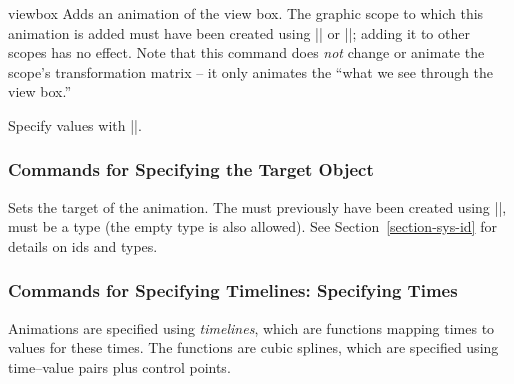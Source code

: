 \begin{sysanimateattribute}{viewbox}
  Adds an animation of the view box. The graphic scope to which this
  animation is added must have been created using
  |\pgfsys@viewboxmeet| or |\pgfsys@viewboxslice|; adding it to other
  scopes has no effect. Note that this command does \emph{not}
  change or animate the scope's transformation matrix -- it only animates the
  ``what we see through the view box.''
  
  Specify values with |\pgfsys@animation@val@viewbox|.
\begin{codeexample}[width=5cm]
\end{codeexample}
\end{sysanimateattribute}


\subsubsection{Commands for Specifying the Target Object}

\begin{command}{\pgfsys@animation@whom{}}
  Sets the target of the animation. The  must previously have
  been created using |\pgfsys@new@id|,  must be a type (the
  empty type is also allowed). See Section~\ref{section-sys-id} for
  details on ids and types.
\end{command}




\subsubsection{Commands for Specifying Timelines: Specifying Times}

Animations are specified using \emph{timelines}, which are functions
mapping times to values for these times. The functions are cubic
splines, which are specified using time--value pairs plus control
points.


